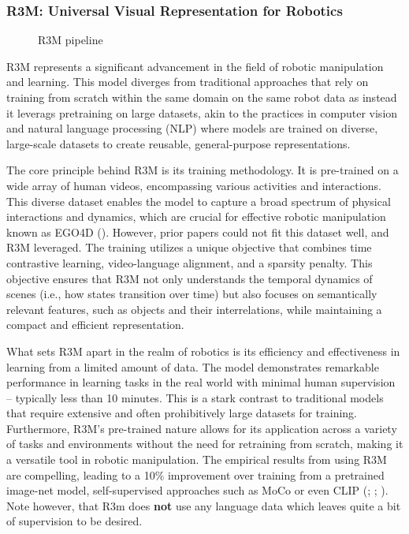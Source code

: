 \documentclass[
  letterpaper,
  numbers=noenddot,
  DIV=11]{scrreprt}
\theoremstyle{plain}
\theoremstyle{definition}
\theoremstyle{plain}
\theoremstyle{remark}
\begin{document}
\subsubsection*{R3M: Universal Visual Representation for
Robotics}\label{r3m-universal-visual-representation-for-robotics}

\begin{figure}


\caption{\label{fig-r3m-pipline}R3M pipeline}

\end{figure}%

R3M represents a significant advancement in the field of robotic
manipulation and learning. This model diverges from traditional
approaches that rely on training from scratch within the same domain on
the same robot data as instead it leverags pretraining on large
datasets, akin to the practices in computer vision and natural language
processing (NLP) where models are trained on diverse, large-scale
datasets to create reusable, general-purpose representations.

The core principle behind R3M is its training methodology. It is
pre-trained on a wide array of human videos, encompassing various
activities and interactions. This diverse dataset enables the model to
capture a broad spectrum of physical interactions and dynamics, which
are crucial for effective robotic manipulation known as EGO4D
(). However, prior
papers could not fit this dataset well, and R3M leveraged. The training
utilizes a unique objective that combines time contrastive learning,
video-language alignment, and a sparsity penalty. This objective ensures
that R3M not only understands the temporal dynamics of scenes (i.e., how
states transition over time) but also focuses on semantically relevant
features, such as objects and their interrelations, while maintaining a
compact and efficient representation.

What sets R3M apart in the realm of robotics is its efficiency and
effectiveness in learning from a limited amount of data. The model
demonstrates remarkable performance in learning tasks in the real world
with minimal human supervision -- typically less than 10 minutes. This
is a stark contrast to traditional models that require extensive and
often prohibitively large datasets for training. Furthermore, R3M's
pre-trained nature allows for its application across a variety of tasks
and environments without the need for retraining from scratch, making it
a versatile tool in robotic manipulation. The empirical results from
using R3M are compelling, leading to a 10\% improvement over training
from a pretrained image-net model, self-supervised approaches such as
MoCo or even CLIP (;
;
). Note however,
that R3m does \textbf{not} use any language data which leaves quite a
bit of supervision to be desired.
\end{document}

